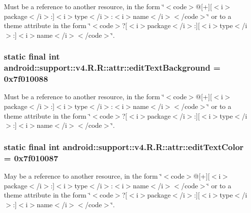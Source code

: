 Must be a reference to another resource, in the form \char`\"{}$<$code$>$@\mbox{[}+\mbox{]}\mbox{[}$<$i$>$package$<$/i$>$:\mbox{]}$<$i$>$type$<$/i$>$:$<$i$>$name$<$/i$>$$<$/code$>$\char`\"{} or to a theme attribute in the form \char`\"{}$<$code$>$?\mbox{[}$<$i$>$package$<$/i$>$:\mbox{]}\mbox{[}$<$i$>$type$<$/i$>$:\mbox{]}$<$i$>$name$<$/i$>$$<$/code$>$\char`\"{}. \hypertarget{classandroid_1_1support_1_1v4_1_1_r_1_1attr_cd4cce28f73e27262d57d299a4c60a7f}{
\subsubsection[{editTextBackground}]{\setlength{\rightskip}{0pt plus 5cm}static final int android::support::v4.R.R::attr::editTextBackground = 0x7f010088}}
\label{classandroid_1_1support_1_1v4_1_1_r_1_1attr_cd4cce28f73e27262d57d299a4c60a7f}


Must be a reference to another resource, in the form \char`\"{}$<$code$>$@\mbox{[}+\mbox{]}\mbox{[}$<$i$>$package$<$/i$>$:\mbox{]}$<$i$>$type$<$/i$>$:$<$i$>$name$<$/i$>$$<$/code$>$\char`\"{} or to a theme attribute in the form \char`\"{}$<$code$>$?\mbox{[}$<$i$>$package$<$/i$>$:\mbox{]}\mbox{[}$<$i$>$type$<$/i$>$:\mbox{]}$<$i$>$name$<$/i$>$$<$/code$>$\char`\"{}. \hypertarget{classandroid_1_1support_1_1v4_1_1_r_1_1attr_a48b198050a49533e0cb20411066751f}{
\subsubsection[{editTextColor}]{\setlength{\rightskip}{0pt plus 5cm}static final int android::support::v4.R.R::attr::editTextColor = 0x7f010087}}
\label{classandroid_1_1support_1_1v4_1_1_r_1_1attr_a48b198050a49533e0cb20411066751f}


May be a reference to another resource, in the form \char`\"{}$<$code$>$@\mbox{[}+\mbox{]}\mbox{[}$<$i$>$package$<$/i$>$:\mbox{]}$<$i$>$type$<$/i$>$:$<$i$>$name$<$/i$>$$<$/code$>$\char`\"{} or to a theme attribute in the form \char`\"{}$<$code$>$?\mbox{[}$<$i$>$package$<$/i$>$:\mbox{]}\mbox{[}$<$i$>$type$<$/i$>$:\mbox{]}$<$i$>$name$<$/i$>$$<$/code$>$\char`\"{}. 

